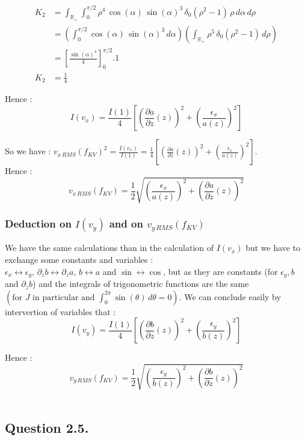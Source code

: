 \documentclass[10pt]{article}
\newcommand{\D}{{\partial}}
\begin{document}
\begin{align*}
K_2 &= \int_{\mathbb{R}_{+}}\int_{0}^{\pi/2}\rho^{4}\,\cos(\alpha)\,\sin(\alpha)^3\,\delta_{0}(\rho^{2}-1)\,\rho\,d\alpha\,d\rho \\
&= \left(\int_{0}^{\pi/2}\cos(\alpha)\,\sin(\alpha)^3\,d\alpha\right)\left(\int_{\mathbb{R}_{+}}\rho^{5}\,\delta_{0}(\rho^{2}-1)\,d\rho\right) \\
&= \left[\frac{\sin(\alpha)^4}{4}\right]_0^{\pi/2}.1 \\
K_2 &= \frac{1}{4}
\end{align*}

Hence :
$$\boxed{I(v_x) = \frac{I(1)}{4}\left[\left(\frac{\D a}{\D z}(z)\right)^2 + \left(\frac{\epsilon_{x}}{a(z)}\right)^2\right]}$$

So we have : $v_{x\,RMS}(f_{KV})^2 = \frac{I(v_x)}{I(1)} = \frac{1}{4}\left[\left(\frac{\D a}{\D z}(z)\right)^2 + \left(\frac{\epsilon_{x}}{a(z)}\right)^2\right]$. \\
Hence : 
$$\boxed{v_{x\,RMS}(f_{KV}) = \frac{1}{2}\sqrt{\left(\frac{\epsilon_{x}}{a(z)}\right)^2 + \left(\frac{\D a}{\D z}(z)\right)^2}}$$


\subsubsection{Deduction on $I(v_y)$ and on $v_{y\,RMS}(f_{KV})$}


We have the same calculations than in the calculation of $I(v_x)$ but we have to exchange some constants and variables : \\
$ \epsilon_{x} \leftrightarrow \epsilon_{y},\, \D_{z} b \leftrightarrow \D_{z} a,\, b \leftrightarrow a$
 and $\sin \leftrightarrow \cos$, but as they are constants (for $\epsilon_{y}, b$ and $\D_{z} b$) and the integrals of trigonometric functions are the same $\left(\mbox{for } J \mbox{ in particular and } \int_{0}^{2\pi}\sin(\theta)\,d\theta = 0\right)$. We can conclude easily by intervertion of variables that : \\
 
$$\boxed{I(v_y) = \frac{I(1)}{4}\left[\left(\frac{\D b}{\D z}(z)\right)^2 + \left(\frac{\epsilon_{y}}{b(z)}\right)^2\right]}$$

Hence : 
$$\boxed{v_{y\,RMS}(f_{KV}) = \frac{1}{2}\sqrt{\left(\frac{\epsilon_{y}}{b(z)}\right)^2 + \left(\frac{\D b}{\D z}(z)\right)^2}}$$ \\


\subsection{Question 2.5.}
\end{document}
